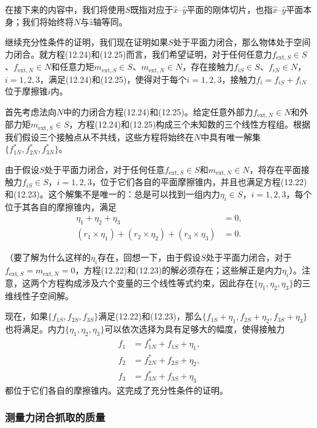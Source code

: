 \documentclass[12pt,a4paper]{article}
\begin{document}
在接下来的内容中，我们将使用$S$既指对应于$\hat{x}$–$\hat{y}$平面的刚体切片，也指$\hat{x}$–$\hat{y}$平面本身；我们将始终将$N$与$\hat{z}$轴等同。

继续充分性条件的证明，我们现在证明如果$S$处于平面力闭合，那么物体处于空间力闭合。就方程(12.24)和(12.25)而言，我们希望证明，对于任何任意力$f_{\text{ext},S} \in S$、$f_{\text{ext},N} \in N$和任意力矩$m_{\text{ext},S} \in S$、$m_{\text{ext},N} \in N$，存在接触力$f_{iS} \in S$、$f_{iN} \in N$，$i = 1, 2, 3$，满足(12.24)和(12.25)，使得对于每个$i = 1, 2, 3$，接触力$f_i = f_{iS} + f_{iN}$位于摩擦锥$i$内。

首先考虑法向$N$中的力闭合方程(12.24)和(12.25)。给定任意外部力$f_{\text{ext},N} \in N$和外部力矩$m_{\text{ext},S} \in S$，方程(12.24)和(12.25)构成三个未知数的三个线性方程组。根据我们假设三个接触点从不共线，这些方程将始终在$N$中具有唯一解集$\{f_{1N}^*, f_{2N}^*, f_{3N}^*\}$。

由于假设$S$处于平面力闭合，对于任何任意$f_{\text{ext},S} \in S$和$m_{\text{ext},N} \in N$，将存在平面接触力$f_{iS} \in S$，$i = 1, 2, 3$，位于它们各自的平面摩擦锥内，并且也满足方程(12.22)和(12.23)。这个解集不是唯一的：总是可以找到一组内力$\eta_i \in S$，$i = 1, 2, 3$，每个位于其各自的摩擦锥内，满足
\begin{align}
\eta_1 + \eta_2 + \eta_3 &= 0, \label{eq:12.26} \\
(r_1 \times \eta_1) + (r_2 \times \eta_2) + (r_3 \times \eta_3) &= 0. \label{eq:12.27}
\end{align}

（要了解为什么这样的$\eta_i$存在，回想一下，由于假设$S$处于平面力闭合，对于$f_{\text{ext},S} = m_{\text{ext},N} = 0$，方程(12.22)和(12.23)的解必须存在；这些解正是内力$\eta_i$）。注意，这两个方程构成涉及六个变量的三个线性等式约束，因此存在$\{\eta_1, \eta_2, \eta_3\}$的三维线性子空间解。

现在，如果$\{f_{1S}, f_{2S}, f_{3S}\}$满足(12.22)和(12.23)，那么$\{f_{1S} + \eta_1, f_{2S} + \eta_2, f_{3S} + \eta_3\}$也将满足。内力$\{\eta_1, \eta_2, \eta_3\}$可以依次选择为具有足够大的幅度，使得接触力
\begin{align}
f_1 &= f_{1N}^* + f_{1S} + \eta_1, \label{eq:12.28} \\
f_2 &= f_{2N}^* + f_{2S} + \eta_2, \label{eq:12.29} \\
f_3 &= f_{3N}^* + f_{3S} + \eta_3 \label{eq:12.30}
\end{align}
都位于它们各自的摩擦锥内。这完成了充分性条件的证明。

\subsubsection{测量力闭合抓取的质量}
\label{subsubsec:measuring_quality_force_closure}
\end{document}
